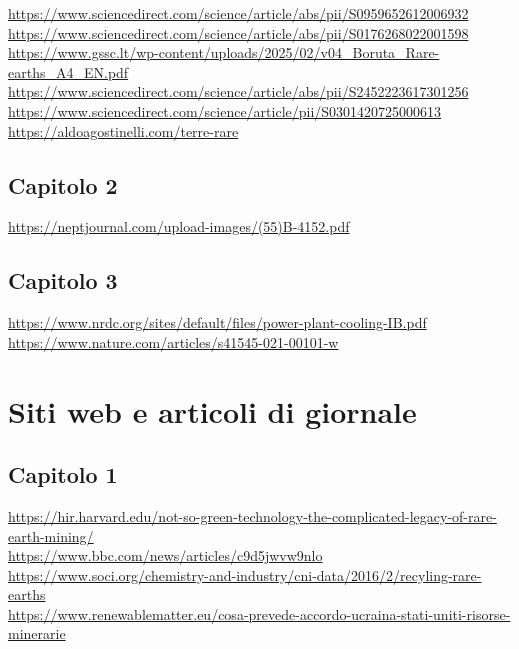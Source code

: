 \documentclass[12pt,a4paper,oneside]{book}
\begin{document}
\url{https://www.sciencedirect.com/science/article/abs/pii/S0959652612006932} \\
\url{https://www.sciencedirect.com/science/article/abs/pii/S0176268022001598} \\
\url{https://www.gssc.lt/wp-content/uploads/2025/02/v04_Boruta_Rare-earths_A4_EN.pdf} \\
\url{https://www.sciencedirect.com/science/article/abs/pii/S2452223617301256} \\
\url{https://www.sciencedirect.com/science/article/pii/S0301420725000613}\\
\url{https://aldoagostinelli.com/terre-rare}

\subsection*{Capitolo 2}
\url{https://neptjournal.com/upload-images/(55)B-4152.pdf}

\subsection*{Capitolo 3}
\url{https://www.nrdc.org/sites/default/files/power-plant-cooling-IB.pdf}\\
\url{https://www.nature.com/articles/s41545-021-00101-w}

\section*{Siti web e articoli di giornale}
\subsection*{Capitolo 1}
\url{https://hir.harvard.edu/not-so-green-technology-the-complicated-legacy-of-rare-earth-mining/} \\
\url{https://www.bbc.com/news/articles/c9d5jwvw9nlo} \\
\url{https://www.soci.org/chemistry-and-industry/cni-data/2016/2/recyling-rare-earths}\\
\url{https://www.renewablematter.eu/cosa-prevede-accordo-ucraina-stati-uniti-risorse-minerarie}
\end{document}
